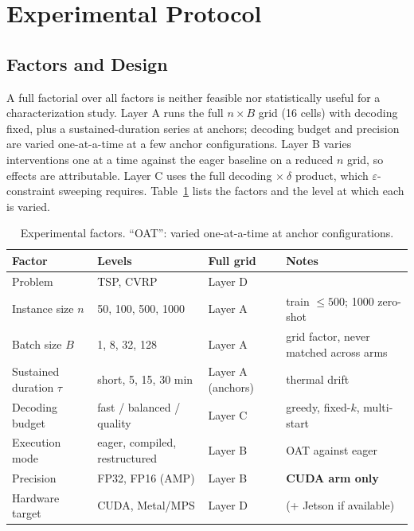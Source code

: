 \documentclass[11pt,a4paper,twocolumn]{article}
\begin{document}
\section{Experimental Protocol}

\subsection{Factors and Design}

A full factorial over all factors is neither feasible nor statistically useful for a
characterization study. Layer A runs the full $n \times B$ grid (16 cells) with
decoding fixed, plus a sustained-duration series at anchors; decoding budget and
precision are varied one-at-a-time at a few anchor configurations. Layer B varies
interventions one at a time against the eager baseline on a reduced $n$ grid, so
effects are attributable. Layer C uses the full decoding $\times\ \delta$ product,
which $\varepsilon$-constraint sweeping requires. Table~\ref{tab:factors} lists the
factors and the level at which each is varied.

\begin{table}[t]
\centering
\small
\begin{tabular}{@{}p{}p{}p{}p{}@{}}
\toprule
\textbf{Factor} & \textbf{Levels} & \textbf{Full grid} & \textbf{Notes} \\
\midrule
Problem & TSP, CVRP & Layer D & \\
Instance size $n$ & 50, 100, 500, 1000 & Layer A & train $\le 500$; 1000 zero-shot \\
Batch size $B$ & 1, 8, 32, 128 & Layer A & grid factor, never matched across arms \\
Sustained duration $\tau$ & short, 5, 15, 30 min & Layer A (anchors) & thermal drift \\
Decoding budget & fast / balanced / quality & Layer C & greedy, fixed-$k$, multi-start \\
Execution mode & eager, compiled, restructured & Layer B & OAT against eager \\
Precision & FP32, FP16 (AMP) & Layer B & \textbf{CUDA arm only} \\
Hardware target & CUDA, Metal/MPS & Layer D & (+ Jetson if available) \\
\bottomrule
\end{tabular}
\caption{Experimental factors. ``OAT'': varied one-at-a-time at anchor
configurations.}
\label{tab:factors}
\end{table}
\end{document}
